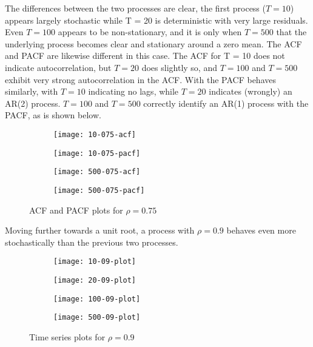 The differences between the two processes are clear, the first process ($T=10$) appears largely stochastic while T = 20 is deterministic with very large residuals. Even $T = 100$ appears to be non-stationary, and it is only when $T = 500$ that the underlying process becomes clear and stationary around a zero mean. The ACF and PACF are likewise different in this case. The ACF for T = 10 does not indicate autocorrelation, but $T = 20$ does slightly so, and $T = 100$ and $T = 500$ exhibit very strong autocorrelation in the ACF. With the PACF behaves similarly, with $T = 10$ indicating no lags, while $T = 20$ indicates (wrongly) an AR(2) process. $T = 100$ and $T = 500$ correctly identify an AR(1) process with the PACF, as is shown below.

\begin{figure}[htp]
	\centering
	\begin{subfigure}{0.23\textwidth}
		\centering
		\texttt{[image: 10-075-acf]}
	\end{subfigure}
	\begin{subfigure}{0.23\textwidth}
		\centering
		\texttt{[image: 10-075-pacf]}
	\end{subfigure}
	\begin{subfigure}{0.23\textwidth}
		\centering
		\texttt{[image: 500-075-acf]}
	\end{subfigure}
	\begin{subfigure}{0.23\textwidth}
		\centering
		\texttt{[image: 500-075-pacf]}
	\end{subfigure}
\caption{ACF and PACF plots for $\rho = 0.75$}
\end{figure}


Moving further towards a unit root, a process with $\rho = 0.9$ behaves even more stochastically than the previous two processes.

\begin{figure}[htp]
	\centering
	\begin{subfigure}{0.23\textwidth}
		\centering
		\texttt{[image: 10-09-plot]}
	\end{subfigure}
	\begin{subfigure}{0.23\textwidth}
		\centering
		\texttt{[image: 20-09-plot]}
	\end{subfigure}
	\begin{subfigure}{0.23\textwidth}
		\centering
		\texttt{[image: 100-09-plot]}
	\end{subfigure}
	\begin{subfigure}{0.23\textwidth}
		\centering
		\texttt{[image: 500-09-plot]}
	\end{subfigure}
\caption{Time series plots for $\rho = 0.9$}
\end{figure}


